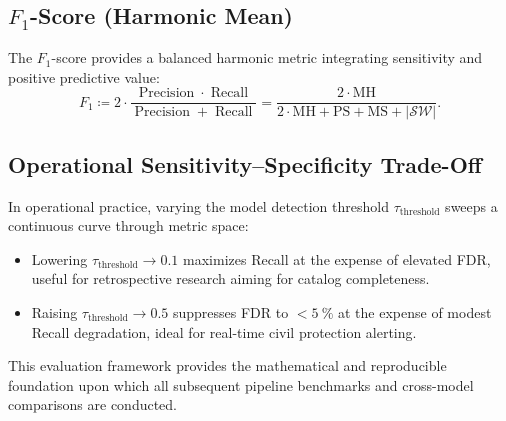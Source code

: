 \subsection{\texorpdfstring{$F_1$}{F1}-Score (Harmonic Mean)}
The $F_1$-score provides a balanced harmonic metric integrating
sensitivity and positive predictive value:
\begin{equation}
  F_1 \coloneqq 2 \cdot \frac{\operatorname{Precision} \cdot
  \operatorname{Recall}}{\operatorname{Precision} +
  \operatorname{Recall}} = \frac{2
  \cdot \mathrm{MH}}{2 \cdot \mathrm{MH} + \mathrm{PS} + \mathrm{MS}
  + |\mathcal{SW}|}.
\end{equation}

\subsection{Operational Sensitivity--Specificity Trade-Off}
In operational practice, varying the model detection threshold
$\tau_{\mathrm{threshold}}$ sweeps a continuous curve through metric space:
\begin{itemize}
  \item Lowering $\tau_{\mathrm{threshold}} \to \num{0.1}$ maximizes
    Recall at the expense of elevated \ac{FDR}, useful for retrospective
    research aiming for catalog completeness.
  \item Raising $\tau_{\mathrm{threshold}} \to \num{0.5}$ suppresses \ac{FDR}
    to $< \qty{5}{\percent}$ at the expense of modest Recall degradation, ideal
    for real-time civil protection alerting.
\end{itemize}

This evaluation framework provides the mathematical and reproducible
foundation upon which all subsequent pipeline benchmarks and
cross-model comparisons are conducted.
